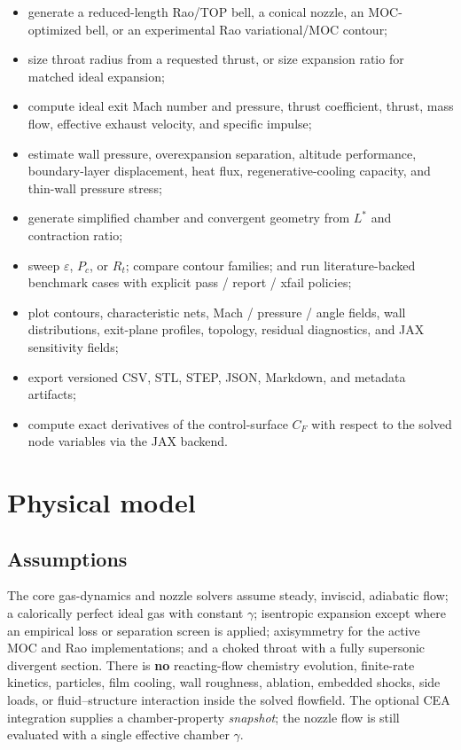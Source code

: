 \documentclass[11pt]{article}
\begin{document}
\begin{itemize}
\item generate a reduced-length Rao/TOP bell, a conical nozzle, an
MOC-optimized bell, or an experimental Rao variational/MOC contour;
\item size throat radius from a requested thrust, or size expansion ratio for
matched ideal expansion;
\item compute ideal exit Mach number and pressure, thrust coefficient,
thrust, mass flow, effective exhaust velocity, and specific impulse;
\item estimate wall pressure, overexpansion separation, altitude performance,
boundary-layer displacement, heat flux, regenerative-cooling capacity, and
thin-wall pressure stress;
\item generate simplified chamber and convergent geometry from $L^*$ and
contraction ratio;
\item sweep $\varepsilon$, $P_c$, or $R_t$; compare contour families; and run
literature-backed benchmark cases with explicit pass / report / xfail
policies;
\item plot contours, characteristic nets, Mach / pressure / angle fields,
wall distributions, exit-plane profiles, topology, residual diagnostics, and
JAX sensitivity fields;
\item export versioned CSV, STL, STEP, JSON, Markdown, and metadata
artifacts;
\item compute exact derivatives of the control-surface $C_F$ with respect to
the solved node variables via the JAX backend.
\end{itemize}

\section{Physical model}

\subsection{Assumptions}

The core gas-dynamics and nozzle solvers assume steady, inviscid, adiabatic
flow; a calorically perfect ideal gas with constant $\gamma$; isentropic
expansion except where an empirical loss or separation screen is applied;
axisymmetry for the active MOC and Rao implementations; and a choked throat
with a fully supersonic divergent section. There is \textbf{no} reacting-flow
chemistry evolution, finite-rate kinetics, particles, film cooling, wall
roughness, ablation, embedded shocks, side loads, or fluid--structure
interaction inside the solved flowfield. The optional CEA integration
supplies a chamber-property \emph{snapshot}; the nozzle flow is still
evaluated with a single effective chamber $\gamma$.
\end{document}
